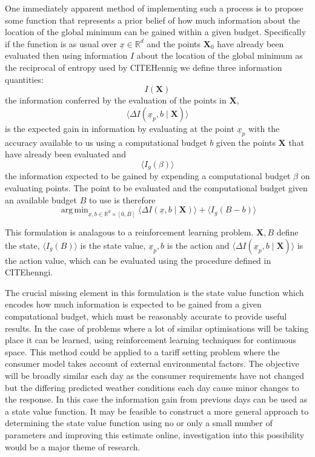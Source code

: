 \documentclass[a4paper, 10 pt, conference]{ieeeconf}  %
\DeclareMathOperator*{\argmin}{arg\,min}
\begin{document}
One immediately apparent method of implementing such a process is to propose some function that represents a prior belief of how much information about the location of the global minimum can be gained within a given budget. Specifically if the function is as usual over $\underline{x} \in \mathbb{R}^{d}$ and the points $\mathbf{X}_{0}$ have already been evaluated then using information $I$ about the location of the global minimum as the reciprocal of entropy used by CITEHennig we define three information quantities:
\begin{equation}
I(\mathbf{X})
\end{equation}
the information conferred by the evaluation of the points in $\mathbf{X}$,
\begin{equation}
\langle\Delta I(\underline{x}_{p},b \mid \mathbf{X})\rangle
\end{equation}
is the expected gain in information by evaluating at the point $\underline{x}_{p}$ with the accuracy available to us using a computational budget $b$ given the points $\mathbf{X}$ that have already been evaluated and
\begin{equation}
\langle I_{g}(\beta)\rangle
\end{equation}
the information expected to be gained by expending a computational budget $\beta$ on evaluating points.
The point to be evaluated and the computational budget given an available budget $B$ to use is therefore
\begin{equation}
\argmin_{\underline{x},b \in \mathbb{R}^{d} \times [0,B]} \langle\Delta I(\underline{x},b \mid \mathbf{X})\rangle + \langle I_{g}(B-b)\rangle
\end{equation}

This formulation is analagous to a reinforcement learning problem. $\mathbf{X},B$ define the state, $\langle I_{g}(B)\rangle$ is the state value, $\underline{x}_{p},b$ is the action and $\langle\Delta I(\underline{x}_{p},b \mid \mathbf{X})\rangle$ is the action value, which can be evaluated using the procedure defined in CITEhenngi.

The crucial missing element in this formulation is the state value function which encodes how much information is expected to be gained from a given computational budget, which must be reasonably accurate to provide useful results. In the case of problems where a lot of similar optimisations will be taking place it can be learned, using reinforcement learning techniques for continuous space. This method could be applied to a tariff setting problem where the consumer model takes account of external environmental factors. The objective will be broadly similar each day as the consumer requirements have not changed but the differing predicted weather conditions each day cause minor changes to the response. In this case the information gain from previous days can be used as a state value function. It may be feasible to construct a more general approach to determining the state value function using no or only a small number of parameters and improving this estimate online, investigation into this possibility would be a major theme of research.
\end{document}
